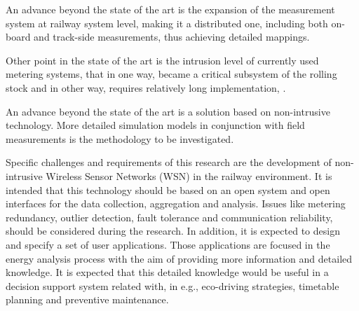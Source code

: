 \documentclass{article}
\begin{document}
An advance beyond the state of the art is the expansion of the measurement system at railway system level, making it a distributed one, including both on-board and track-side measurements, thus achieving detailed mappings. 

\vspace{2em}

Other point in the state of the art is the intrusion level of currently used metering systems, that in one way, became a critical subsystem of the rolling stock and in other way, requires relatively long implementation, \citep{shift2rail2015}. 

An advance beyond the state of the art is a solution based on non-intrusive technology. More detailed simulation models in conjunction with field measurements is the methodology to be investigated.




	Specific challenges and requirements of this research are the development of non-intrusive Wireless Sensor Networks (WSN)  in the railway environment. 
	It is intended that this technology should be based on an open system and open interfaces for the data collection, aggregation and analysis. 
	Issues like metering redundancy, outlier detection, fault tolerance and communication reliability, should be considered during the research.
	In addition, it is expected to design and specify a set of user applications.
	Those applications are focused in the energy analysis process with the aim of providing more information and detailed knowledge.
	It is expected that this detailed knowledge would be useful in a decision support system related with, in e.g., eco-driving strategies, timetable planning and preventive maintenance.
	






\end{document}

